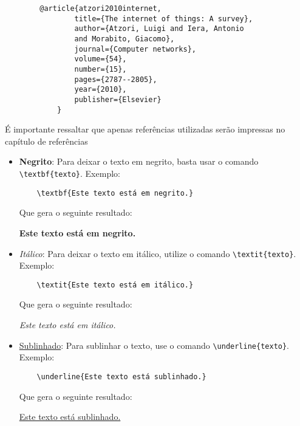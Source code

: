 \begin{itemize}
    \begin{verbatim}
        @article{atzori2010internet,
                title={The internet of things: A survey},
                author={Atzori, Luigi and Iera, Antonio 
                and Morabito, Giacomo},
                journal={Computer networks},
                volume={54},
                number={15},
                pages={2787--2805},
                year={2010},
                publisher={Elsevier}
            }
    \end{verbatim}


    É importante ressaltar que apenas referências utilizadas serão impressas no capítulo de referências

\end{itemize}


\begin{itemize}
    \item \textbf{Negrito}: Para deixar o texto em negrito, basta usar o comando \texttt{\textbackslash textbf\{texto\}}. Exemplo:
    \begin{verbatim}
    \textbf{Este texto está em negrito.}
    \end{verbatim}

    Que gera o seguinte resultado:

    \hspace{1cm}\textbf{Este texto está em negrito.}
    
    \item \textit{Itálico}: Para deixar o texto em itálico, utilize o comando \texttt{\textbackslash textit\{texto\}}. Exemplo:
    \begin{verbatim}
    \textit{Este texto está em itálico.}
    \end{verbatim}

    Que gera o seguinte resultado:

    \hspace{1cm}\textit{Este texto está em itálico.}
    
    \item \underline{Sublinhado}: Para sublinhar o texto, use o comando \texttt{\textbackslash underline\{texto\}}. Exemplo:
    \begin{verbatim}
    \underline{Este texto está sublinhado.}
    \end{verbatim}

    Que gera o seguinte resultado:

    \hspace{1cm}\underline{Este texto está sublinhado.}
    

\end{itemize}
